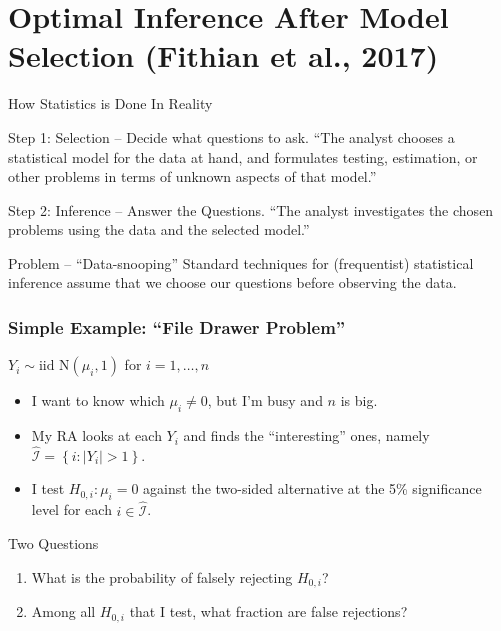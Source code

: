 \section{Optimal Inference After Model Selection (Fithian et al., 2017)}

\begin{frame}{How Statistics is Done In Reality}

  \begin{block}{Step 1: Selection -- Decide what questions to ask.}
    ``The analyst chooses a statistical model for the data at hand, and formulates testing, estimation, or other problems in terms of unknown aspects of that model.''
  \end{block}

  \begin{block}{Step 2: Inference -- Answer the Questions.}
   ``The analyst investigates the chosen problems using the data and the selected model.''
  \end{block}

  \begin{alertblock}{Problem -- ``Data-snooping''}
    Standard techniques for (frequentist) statistical inference assume that we choose our questions \alert{before} observing the data.  
  \end{alertblock}

\end{frame}
\begin{frame}
  \frametitle{Simple Example: ``File Drawer Problem''}

  \begin{block}{$Y_i \sim \mbox{iid N}(\mu_i, 1)$ for $i=1, \dots, n$}
  \begin{itemize}
    \item I want to know which $\mu_i \neq 0$, but I'm busy and $n$ is big.
    \item My RA looks at each $Y_i$ and finds the ``interesting'' ones, namely $\widehat{\mathcal{I}} =\left\{ i\colon |Y_i|>1 \right\}$.
    \item I test $H_{0,i}\colon \mu_i = 0$ against the two-sided alternative at the 5\% significance level for each $i \in \widehat{\mathcal{I}}$.
  \end{itemize}
\end{block}

  \begin{alertblock}{Two Questions}
    \begin{enumerate}
      \item What is the probability of falsely rejecting $H_{0,i}$?
      \item Among all $H_{0,i}$ that I test, what fraction are false rejections? 
    \end{enumerate}
  \end{alertblock}

\end{frame}
